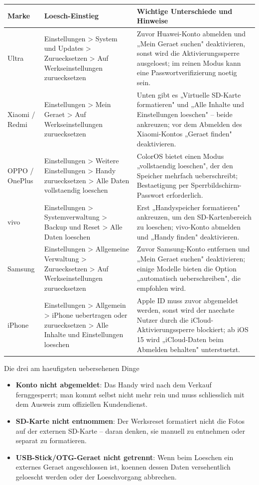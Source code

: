 \begin{center}
\begin{tabularx}{\linewidth}{|X|X|X|}
\hline
\textbf{Marke} & \textbf{Loesch-Einstieg} & \textbf{Wichtige Unterschiede und Hinweise} \tabularnewline
\hline
Ultra & Einstellungen > System und Updates > Zuruecksetzen > Auf Werkseinstellungen zuruecksetzen & Zuvor Huawei-Konto abmelden und „Mein Geraet suchen" deaktivieren, sonst wird die Aktivierungssperre ausgeloest; im reinen Modus kann eine Passwortverifizierung noetig sein. \tabularnewline
Xiaomi / Redmi & Einstellungen > Mein Geraet > Auf Werkseinstellungen zuruecksetzen & Unten gibt es „Virtuelle SD-Karte formatieren" und „Alle Inhalte und Einstellungen loeschen" – beide ankreuzen; vor dem Abmelden des Xiaomi-Kontos „Geraet finden" deaktivieren. \tabularnewline
OPPO / OnePlus & Einstellungen > Weitere Einstellungen > Handy zuruecksetzen > Alle Daten vollstaendig loeschen & ColorOS bietet einen Modus „vollstaendig loeschen", der den Speicher mehrfach ueberschreibt; Bestaetigung per Sperrbildschirm-Passwort erforderlich. \tabularnewline
vivo & Einstellungen > Systemverwaltung > Backup und Reset > Alle Daten loeschen & Erst „Handyspeicher formatieren" ankreuzen, um den SD-Kartenbereich zu loeschen; vivo-Konto abmelden und „Handy finden" deaktivieren. \tabularnewline
Samsung & Einstellungen > Allgemeine Verwaltung > Zuruecksetzen > Auf Werkseinstellungen zuruecksetzen & Zuvor Samsung-Konto entfernen und „Mein Geraet suchen" deaktivieren; einige Modelle bieten die Option „automatisch ueberschreiben", die empfohlen wird. \tabularnewline
iPhone & Einstellungen > Allgemein > iPhone uebertragen oder zuruecksetzen > Alle Inhalte und Einstellungen loeschen & Apple ID muss zuvor abgemeldet werden, sonst wird der naechste Nutzer durch die iCloud-Aktivierungssperre blockiert; ab iOS 15 wird „iCloud-Daten beim Abmelden behalten" unterstuetzt. \tabularnewline
\hline
\end{tabularx}
\end{center}

\begin{tcbwarn}{Die drei am haeufigsten uebersehenen Dinge}
\begin{itemize}
  \item \textbf{Konto nicht abgemeldet}: Das Handy wird nach dem Verkauf fernggesperrt; man kommt selbst nicht mehr rein und muss schliesslich mit dem Ausweis zum offiziellen Kundendienst.
  \item \textbf{SD-Karte nicht entnommen}: Der Werksreset formatiert nicht die Fotos auf der externen SD-Karte – daran denken, sie manuell zu entnehmen oder separat zu formatieren.
  \item \textbf{USB-Stick/OTG-Geraet nicht getrennt}: Wenn beim Loeschen ein externes Geraet angeschlossen ist, koennen dessen Daten versehentlich geloescht werden oder der Loeschvorgang abbrechen.
\end{itemize}

\end{tcbwarn}

